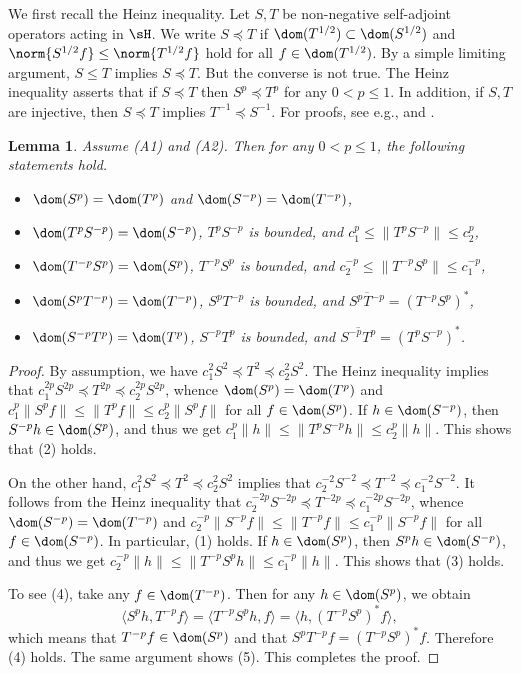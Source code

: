 \documentclass[12pt,draft]{article}
\theoremstyle{plain}
\newtheorem{lem}[theorem]{\bf Lemma}
\numberwithin{equation}{section}
\theoremstyle{remark}
\begin{document}
We first recall the Heinz inequality. 
Let $S, T$ be non-negative self-adjoint operators acting in $\sH$.
We write $S \preceq T$ if $\dom(T^{1/2}) \subset \dom(S^{1/2})$ and $\norm{S^{1/2}f} \leq \norm{T^{1/2}f}$ hold for all $f \in \dom(T^{1/2})$.
By a simple limiting argument, $S \leq T$ implies $S \preceq T$.
But the converse is not true. The Heinz inequality asserts that if $S \preceq T$ then $S^p \preceq T^p$ for any $0 < p \leq 1$.
In addition, if $S, T$ are injective, then $S \preceq T$ implies $T^{-1} \preceq S^{-1}$. 
For proofs, see e.g., \cite[Proposition 10.14]{Sc12} and \cite[Corollary 10.12]{Sc12}.


\begin{lem}\label{bounded}
Assume (A1) and (A2).
Then for any $0<p\leq1$, the following statements hold.
\begin{itemize}
\item[(1)] $\dom(S^p)=\dom(T^p)$ and $\dom(S^{-p})=\dom(T^{-p})$,
\item[(2)] $\dom(T^pS^{-p})=\dom(S^{-p})$, $T^pS^{-p}$ is bounded, and $c_1^p\leq\|T^pS^{-p}\|\leq c_2^p$,
\item[(3)] $\dom(T^{-p}S^p)=\dom(S^p)$, $T^{-p}S^p$ is bounded, and $c_2^{-p}\leq\|T^{-p}S^p\|\leq c_1^{-p}$,
\item[(4)] $\dom(S^pT^{-p})=\dom(T^{-p})$, $S^pT^{-p}$ is bounded, and $\overline{S^pT^{-p}}=\left(T^{-p}S^p\right)^*$,
\item[(5)] $\dom(S^{-p}T^p)=\dom(T^p)$, $S^{-p}T^p$ is bounded, and $\overline{S^{-p}T^p}=\left(T^pS^{-p}\right)^*$.
\end{itemize}
\end{lem}

\begin{proof}
By assumption, we have $c_1^2 S^2 \preceq T^2 \preceq c_2^2 S^2$. 
The Heinz inequality implies that $c_1^{2p}S^{2p} \preceq T^{2p} \preceq c_2^{2p}S^{2p}$, 
whence  $\dom(S^p)=\dom(T^p)$ and 
$c_1^p\|S^pf\|\leq\|T^pf\|\leq c_2^p\|S^pf\|$ for all $f\in\dom(S^p)$.
If $h\in\dom(S^{-p})$, then $S^{-p}h\in\dom(S^p)$, and thus we get $c_1^p\|h\|\leq\|T^pS^{-p}h\|\leq c_2^p\|h\|$.
This shows that (2) holds.

On the other hand, $c_1^2S^2\preceq T^2\preceq c_2^2S^2$ implies that $c_2^{-2}S^{-2}\preceq T^{-2}\preceq c_1^{-2}S^{-2}$.
It follows from the Heinz inequality that $c_2^{-2p}S^{-2p}\preceq T^{-2p}\preceq c_1^{-2p}S^{-2p}$, 
whence $\dom(S^{-p})=\dom(T^{-p})$ and $c_2^{-p}\|S^{-p}f\|\leq\|T^{-p}f\|\leq c_1^{-p}\|S^{-p}f\|$ for all $f\in\dom(S^{-p})$.
In particular, (1) holds.
If $h\in\dom(S^p )$, then $S^p h\in\dom(S^{-p})$, and thus we get $c_2^{-p}\|h\|\leq\|T^{-p}S^p h\|\leq c_1^{-p}\|h\|$.
This shows that (3) holds.

To see (4), take any $f\in\dom(T^{-p})$.
Then for any $h\in\dom(S^p )$, we obtain
\[
  \langle S^p h, T^{-p}f\rangle = \langle T^{-p}S^p h, f\rangle = \langle h, \left(T^{-p}S^p \right)^*f\rangle,
\]
which means that $T^{-p}f\in\dom(S^p )$ and that $S^p T^{-p}f = (T^{-p}S^p)^*f$.
Therefore (4) holds.
The same argument shows (5).
This completes the proof.
\end{proof}
\end{document}
